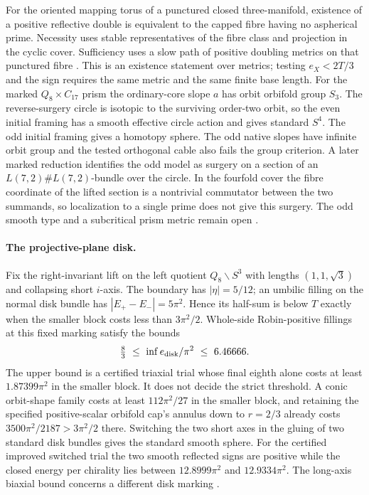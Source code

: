 \documentclass[11pt,letterpaper]{article}
\numberwithin{equation}{section}
\theoremstyle{definition}
\begin{document}
For the oriented mapping torus of a punctured closed three-manifold,
existence of a positive reflective double is equivalent to the capped
fibre having no aspherical prime. Necessity uses stable representatives
of the fibre class and projection in the cyclic cover. Sufficiency
uses a slow path of positive doubling metrics on that punctured fibre
\cite{Kotschick2017Formal,CarlottoLi2024Boundary,Baker2026MarkedCutCalculations}.
This is an existence statement over metrics; testing \(e_X<2T/3\)
and the sign requires the same metric and the same finite base length.
For the marked \(Q_8\times C_{17}\) prism the ordinary-core slope
\(a\) has orbit orbifold group \(S_3\). The reverse-surgery circle is
isotopic to the surviving order-two orbit, so the even initial framing
has a smooth effective circle action and gives standard \(S^4\).
The odd initial framing gives a homotopy sphere. The odd native slopes
have infinite orbit group and the tested orthogonal cable also fails
the group criterion. A later marked reduction identifies the odd model
as surgery on a section of an \(L(7,2)\#L(7,2)\)-bundle over the circle.
In the fourfold cover the fibre coordinate of the lifted section is a
nontrivial commutator between the two summands, so localization to a
single prime does not give this surgery. The odd smooth type and a subcritical prism
metric remain open
\cite[TUBE, marked surgery and its independent replay]{Baker2026MarkedCutCalculations}.

\paragraph{The projective-plane disk.}
Fix the right-invariant lift on the left quotient \(Q_8\backslash S^3\) with
lengths \((1,1,\sqrt3)\) and collapsing short \(i\)-axis. The boundary
has \(|\eta|=5/12\); an umbilic filling on the normal disk bundle has
\(|E_+-E_-|=5\pi^2\). Hence its half-sum is below \(T\) exactly when
the smaller block costs less than \(3\pi^2/2\). Whole-side Robin-positive
fillings at this fixed marking satisfy the bounds
\[
       \tfrac83\ \le\ \inf e_{\rm disk}/\pi^2\ \le\ 6.46666 .
\]
The upper bound is a certified triaxial trial whose final eighth alone
costs at least \(1.87399\pi^2\) in the smaller block. It does not
decide the strict threshold. A conic orbit-shape family costs at least
\(112\pi^2/27\) in the smaller block, and retaining the specified
positive-scalar orbifold cap's annulus down to \(r=2/3\) already costs
\(3500\pi^2/2187>3\pi^2/2\) there. Switching the two short axes in the
gluing of two standard disk bundles gives the standard smooth sphere.
For the certified improved switched trial the two smooth reflected
signs are positive while the closed energy per chirality lies between
\(12.8999\pi^2\) and \(12.9334\pi^2\).
The long-axis biaxial bound concerns a different disk marking
\cite[SEAM and TUBE, short-axis fillings]{Baker2026MarkedCutCalculations}.
\end{document}
